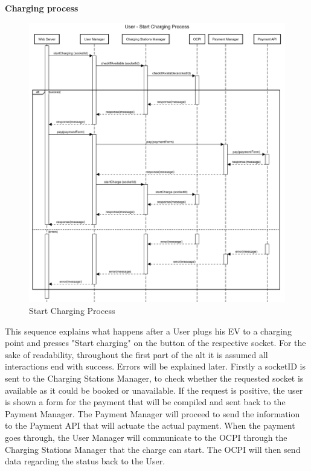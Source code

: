 \documentclass[table, 12pt]{article}
\begin{document}
\newpage
\textbf{Charging process}
\begin{center}
    \begin{figure}[H]
        \includegraphics[scale=0.10, center]{assets/sequenceDiagrams/User Start Charging Process.png}
        \caption{Start Charging Process}
        \label{Start Charging Process}
    \end{figure}
\end{center}
This sequence explains what happens after a User plugs his EV to a charging point and presses "Start charging" on the button of the respective socket. For the sake of readability, throughout the first part of the alt it is assumed all interactions end with success. Errors will be explained later.\newline
Firstly a socketID is sent to the Charging Stations Manager, to check whether the requested socket is available as it could be booked or unavailable. If the request is positive, the user is shown
a form for the payment that will be compiled and sent back to the Payment Manager. The Payment Manager will proceed to send the information to the Payment API that will actuate the actual payment.
When the payment goes through, the User Manager will communicate to the OCPI through the Charging Stations Manager that the charge can start. The OCPI will then send data regarding the status back to the User.
\end{document}

